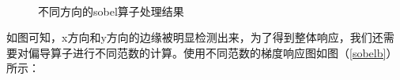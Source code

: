 \documentclass[a4paper,11pt,UTF8]{ctexart}
\begin{document}
\begin{figure}[htbp]
{\begin{minipage}{0.4\textwidth}
    \end{minipage}
    }
    \\
    \caption{不同方向的sobel算子处理结果}    %
    \label{fig:1}    %
\end{figure}
如图可知，x方向和y方向的边缘被明显检测出来，为了得到整体响应，我们还需要对偏导算子进行不同范数的计算。使用不同范数的梯度响应图如图（\ref{sobelb}）所示：
\end{document}

